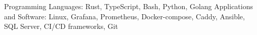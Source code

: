 
\begin{cvskills}
  \cvskill
    {Programming Languages:}
    {Rust, TypeScript, Bash, Python, Golang}
  \cvskill
    {Applications and Software:}
    {Linux, Grafana, Prometheus, Docker-compose, Caddy, Ansible, SQL Server, CI/CD frameworks, Git}
\end{cvskills}

